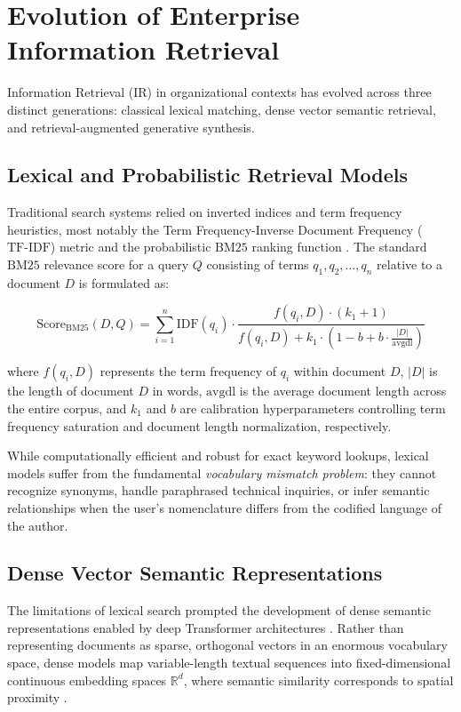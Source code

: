 \section{Evolution of Enterprise Information Retrieval}
\label{sec:lit_ir_evolution}

Information Retrieval (IR) in organizational contexts has evolved across three distinct generations: classical lexical matching, dense vector semantic retrieval, and retrieval-augmented generative synthesis.

\subsection{Lexical and Probabilistic Retrieval Models}
Traditional search systems relied on inverted indices and term frequency heuristics, most notably the Term Frequency-Inverse Document Frequency ($\text{TF-IDF}$) metric and the probabilistic $\text{BM25}$ ranking function \cite{robertson2009probabilistic}. The standard $\text{BM25}$ relevance score for a query $Q$ consisting of terms $q_1, q_2, \dots, q_n$ relative to a document $D$ is formulated as:

\begin{equation}
\text{Score}_{\text{BM25}}(D, Q) = \sum_{i=1}^{n} \text{IDF}(q_i) \cdot \frac{f(q_i, D) \cdot (k_1 + 1)}{f(q_i, D) + k_1 \cdot \left(1 - b + b \cdot \frac{|D|}{\text{avgdl}}\right)}
\label{eq:bm25}
\end{equation}

where $f(q_i, D)$ represents the term frequency of $q_i$ within document $D$, $|D|$ is the length of document $D$ in words, $\text{avgdl}$ is the average document length across the entire corpus, and $k_1$ and $b$ are calibration hyperparameters controlling term frequency saturation and document length normalization, respectively. 

While computationally efficient and robust for exact keyword lookups, lexical models suffer from the fundamental \emph{vocabulary mismatch problem}: they cannot recognize synonyms, handle paraphrased technical inquiries, or infer semantic relationships when the user's nomenclature differs from the codified language of the author.

\subsection{Dense Vector Semantic Representations}
The limitations of lexical search prompted the development of dense semantic representations enabled by deep Transformer architectures \cite{vaswani2017attention}. Rather than representing documents as sparse, orthogonal vectors in an enormous vocabulary space, dense models map variable-length textual sequences into fixed-dimensional continuous embedding spaces $\mathbb{R}^d$, where semantic similarity corresponds to spatial proximity \cite{karpukhin2020dense}.

